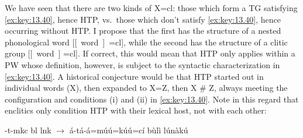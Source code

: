 \documentclass[output=paper]{langsci/langscibook}
\begin{document}
\ea\label{ex:key:13.40}
\z
We have seen that there are two kinds of X=cl: those which form a
\gls{TG} satisfying \eqref{ex:key:13.40}, hence \gls{HTP}, vs.\ those
which don’t satisfy \eqref{ex:key:13.40}, hence occurring without \gls{HTP}. I
propose that the first has the structure of a nested phonological word
[[~word~]~=cl], while the second has the structure of a
clitic group [[~word~] =cl]. If correct, this would mean that
\gls{HTP} only applies within a \gls{PW} whose definition, however, is subject
to the syntactic characterization in \eqref{ex:key:13.40}. A historical
conjecture would be that \gls{HTP} started out in individual words (X), then
expanded to X=Z, then X \# Z, always meeting the configuration and conditions
(i) and (ii) in \eqref{ex:key:13.40}. Note in this regard that enclitics only
condition \gls{HTP} with their lexical host, not with each other:

\ea\label{ex:key:13.41}
    -t-mkc
         bl lnk ${\rightarrow}$
        á-tá-á=\ds{}múú=\ds{}kúú=\ds{}cí
        bùlì lúnàkú\\\vspace{2.75\baselineskip}
\end{document}
